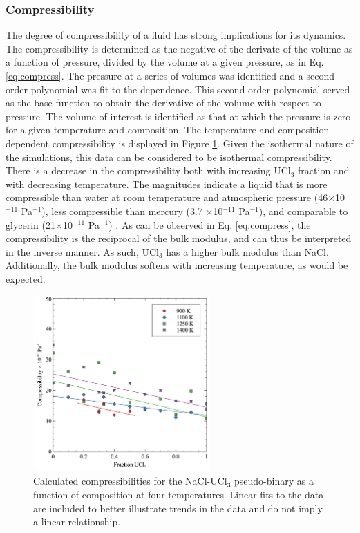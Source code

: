\documentclass[preprint,3p,10pt,onecolumn,number,sort&compress]{elsarticle}
\begin{document}
\FloatBarrier

\subsubsection{Compressibility}

The degree of compressibility of a fluid has strong implications for its dynamics. The compressibility is determined as the negative of the derivate of the volume as a function of pressure, divided by the volume at a given pressure, as in Eq. \ref{eq:compress}. The pressure at a series of volumes was identified and a second-order polynomial was fit to the dependence. This second-order polynomial served as the base function to obtain the derivative of the volume with respect to pressure. The volume of interest is identified as that at which the pressure is zero for a given temperature and composition. The temperature and composition-dependent compressibility is displayed in Figure \ref{fig:compress}. Given the isothermal nature of the simulations, this data can be considered to be isothermal compressibility. There is a decrease in the compressibility both with increasing UCl$_3$ fraction and with decreasing temperature. The magnitudes indicate a liquid that is more compressible than water at room temperature and atmospheric pressure (46$\times$10$^{-11}$ Pa$^{-1}$), less compressible than mercury (3.7 $\times$10$^{-11}$ Pa$^{-1}$), and comparable to glycerin (21$\times$10$^{-11}$ Pa$^{-1}$) \cite{aiphandbook}. As can be observed in Eq. \ref{eq:compress}, the compressibility is the reciprocal of the bulk modulus, and can thus be interpreted in the inverse manner. As such, UCl$_3$ has a higher bulk modulus than NaCl. Additionally, the bulk modulus softens with increasing temperature, as would be expected. 

\begin{figure}[htb]
\centering
\includegraphics[width=0.6\textwidth]{fig10.jpg}
\caption{Calculated compressibilities for the NaCl-UCl{$_3$} pseudo-binary as a function of composition at four temperatures. Linear fits to the data are included to better illustrate trends in the data and do not imply a linear relationship.} 
\label{fig:compress}
\end{figure}
\end{document}
